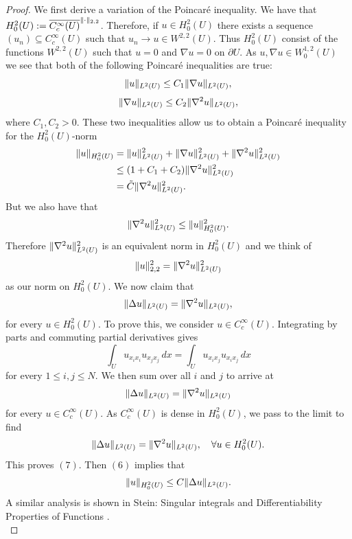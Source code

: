 \documentclass{article}
\DeclarePairedDelimiter{\norm}{\lVert}{\rVert}
\begin{document}
\begin{flushleft}
\begin{proof}
We first derive a variation of the Poincaré inequality. We have that $H_0^2(U):=\overline{C_c^{\infty}(U)}^{\norm{\cdot}_{2,2}}$. Therefore, if $u\in H_0^2(U)$ there exists a sequence $(u_n)\subseteq C_c^{\infty}(U)$ such that $u_n\to u \in W^{2,2}(U)$. Thus $H_0^2(U)$ consist of the functions $W^{2,2}(U)$ such that $u=0$ and $\nabla u =0$ on $\partial U$. As $u,\nabla u \in W_0^{1,2}(U)$ we see that both of the following Poincaré inequalities are true:
$$\norm{u}_{L^2(U)}\le C_1\norm{\nabla u}_{L^2(U)},$$
$$\norm{\nabla u}_{L^2(U)}\le C_2\norm{\nabla^2 u}_{L^2(U)},$$
where $C_1,C_2>0$. These two inequalities allow us to obtain a Poincaré inequality for the $H_0^2(U)$-norm
\begin{align*}
    \norm{u}_{H_0^2(U)} &= \norm{u}_{L^2(U)}^2 + \norm{\nabla u}_{L^2(U)}^2 + \norm{\nabla^2 u}_{L^2(U)}^2 \\&\le
    (1+C_1+C_2)\norm{\nabla^2 u}_{L^2(U)}^2 \\&=
    \tilde{C}\norm{\nabla^2 u}_{L^2(U)}^2.
\end{align*}
But we also have that
$$\norm{\nabla^2 u}_{L^2(U)}^2 \le \norm{u}_{H_0^2(U)}^2.$$
Therefore $\norm{\nabla^2 u}_{L^2(U)}^2$ is an equivalent norm in $H_0^2(U)$ and we think of 
\begin{equation} \norm{u}_{2,2}^2 =\norm{\nabla^2 u}_{L^2(U)}^2 \end{equation}
as our norm on $H_0^2(U)$. We now claim that
\begin{equation}
    \norm{\Delta u}_{L^2(U)}=\norm{\nabla^2 u}_{L^2(U)},
\end{equation}
for every $u\in H_0^2(U).$ To prove this, we consider $u\in C_c^{\infty}(U)$. Integrating by parts and commuting partial derivatives gives
$$\int_U u_{x_ix_i}u_{x_jx_j}\,dx = \int_U u_{x_ix_j}u_{x_ix_j}\,dx $$
for every $1\le i,j\le N$. We then sum over all $i$ and $j$ to arrive at
$$\norm{\Delta u}_{L^2(U)}= \norm{\nabla^2 u}_{L^2(U)}$$
for every $u\in C_c^{\infty}(U).$ As $C_c^{\infty}(U)$ is dense in $H_0^2(U)$, we pass to the limit to find
$$\norm{\Delta u}_{L^2(U)}=\norm{\nabla^2 u}_{L^2(U)},\quad \forall u\in H_0^2(U).$$
This proves $(7)$. Then $(6)$ implies that 
\begin{equation}\norm{u}_{H_0^2(U)}\le C\norm{\Delta u}_{L^2(U)}.\end{equation}
A similar analysis is shown in Stein: Singular integrals and Differentiability Properties of Functions \cite{10.2307/j.ctt1bpmb07}.
\\
\bigskip

\end{proof}
\end{flushleft}
\end{document}
